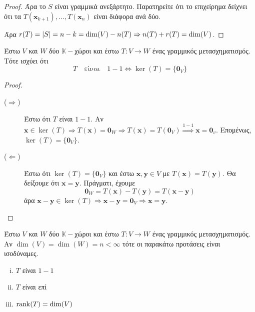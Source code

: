 \begin{proof}
   Άρα το $S$ είναι γραμμικά ανεξάρτητο. Παρατηρείτε ότι το επιχείρημα δείχνει ότι 
   τα $ T(\mathbf{x}_{k+1}), \ldots, T(\mathbf{x}_{n}) $ είναι διάφορα ανά δύο. 

   Άρα $ r(T) = \abs{S} = n-k = \dim(V) - n(T) \Rightarrow n(T) + r(T) = \dim(V) $.
\end{proof}

\begin{thm}
  Έστω $ V $ και $W$ δύο $ \mathbb{K}- $χώροι και έστω $ T \colon V \to W $ ένας 
  γραμμικός μετασχηματισμός. Τότε ισχύει ότι 
  \[
    T \quad \text{είναι} \quad 1-1 \Leftrightarrow \ker(T) = \{ \mathbf{0}_{V} \} 
  \] 
\end{thm}

\begin{proof}
\item {}
  \begin{description}
    \item [($ \Rightarrow $)] Έστω ότι $T$ είναι $ 1-1 $. Αν $ \mathbf{x} \in \ker(T)
      \Rightarrow T(\mathbf{x}) = \mathbf{0}_{W} \Rightarrow T(\mathbf{x}) =
      T(\mathbf{0}_{V}) \overset{1-1}{\Rightarrow} \mathbf{x} = \mathbf{0}_{v} $. 
      Επομένως, $ \ker(T ) = \{\mathbf{0}_{V} \} $.
    \item [($ \Leftarrow $)] Έστω ότι $ \ker(T) = \{ \mathbf{0}_{V} \} $ και έστω 
      $ \mathbf{x}, \mathbf{y} \in V $ με $ T(\mathbf{x}) = T(\mathbf{y}) $. Θα 
      δείξουμε ότι $ \mathbf{x} = \mathbf{y} $. Πράγματι, έχουμε
      \[
        \mathbf{0}_{W} = T(\mathbf{x}) - T(\mathbf{y}) = T(\mathbf{x} - \mathbf{y}) 
      \]
      άρα $ \mathbf{x} - \mathbf{y} \in \ker(T) \Rightarrow \mathbf{x}- \mathbf{y} =
      \mathbf{0}_{V} \Rightarrow \mathbf{x} = \mathbf{y} $.
  \end{description}
\end{proof}

\begin{thm}
  Έστω $ V $ και $W$ δύο $ \mathbb{K}- $χώροι και έστω $ T \colon V \to W $ ένας 
  γραμμικός μετασχηματισμός. Αν $ \dim(V) = \dim(W) = n < \infty $ τότε οι 
  παρακάτω προτάσεις είναι ισοδύναμες.
  \begin{enumerate}[(i)]
    \item $T$ είναι $ 1-1 $
    \item $T$ είναι επί
    \item $ \rank(T) = \dim(V) $
  \end{enumerate}
\end{thm}

